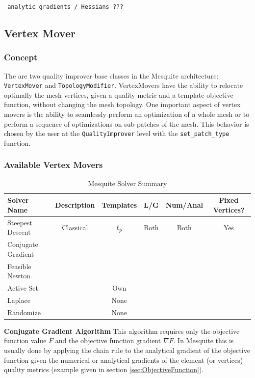 \begin{verbatim} analytic gradients / Hessians ??? \end{verbatim} 

\subsection{Vertex Mover} \label{sec:VertexMover}

\subsubsection{Concept}
The are two quality improver base classes in the Mesquite architecture: \texttt{VertexMover} and
\texttt{TopologyModifier}. VertexMovers have the ability to relocate optimally the mesh vertices,
given a quality metric and a template objective function, without changing the mesh topology.
One important aspect of vertex movers is
the ability to seamlessly perform an optimization of a whole mesh or
to perform a sequence of optimizations on sub-patches of the mesh.
This behavior is chosen by the user at the \texttt{QualityImprover}
level with the \texttt{set\_patch\_type} function. 

\subsubsection{Available Vertex Movers}

\begin{table}[h]
\begin{center}
\begin{tabular}{|l|c|c|c|c|c|}
\hline
Solver Name & Description & Templates & L/G & Num/Anal & Fixed Vertices? \\ \hline
Steepest Descent & Classical & $\ell_p$ & Both & Both & Yes \\
Conjugate Gradient & & & & & \\
Feasible Newton & & & & & \\
Active Set & & Own & & & \\
Laplace & & None & & & \\
Randomize & & None & & & \\
\hline
\end{tabular}
\caption{\label{Solvers} Mesquite Solver Summary}
\end{center}
\end{table}

{\bf Conjugate Gradient Algorithm } \newline
\label{append_conjgrad}
This algorithm requires only
the objective function value $F$ and the objective function gradient $\nabla F$. 
In Mesquite this is usually done by applying the chain rule to the
analytical gradient of the objective function given the numerical or
analytical gradients of the element (or vertices) quality metrics 
(example given in section \ref{sec:ObjectiveFunction}). 


